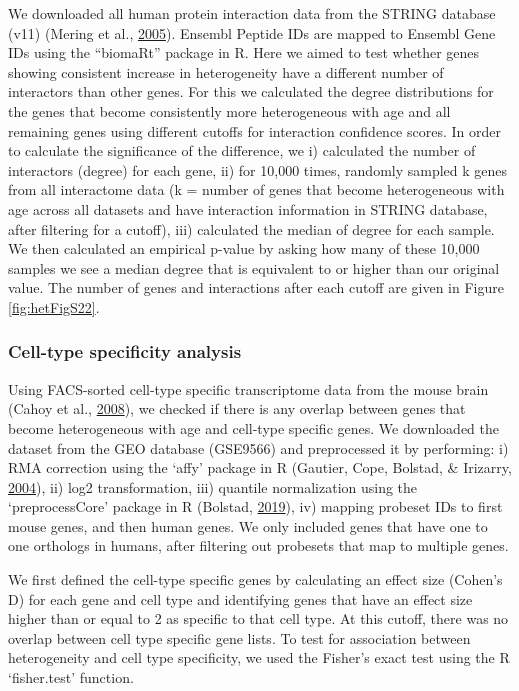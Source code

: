 \documentclass[12pt,twoside]{unicam}
\begin{document}
We downloaded all human protein interaction data from the STRING database (v11) (Mering et al., \protect\hyperlink{ref-VonMering2005}{2005}). Ensembl Peptide IDs are mapped to Ensembl Gene IDs using the ``biomaRt'' package in R. Here we aimed to test whether genes showing consistent increase in heterogeneity have a different number of interactors than other genes. For this we calculated the degree distributions for the genes that become consistently more heterogeneous with age and all remaining genes using different cutoffs for interaction confidence scores. In order to calculate the significance of the difference, we i) calculated the number of interactors (degree) for each gene, ii) for 10,000 times, randomly sampled k genes from all interactome data (k = number of genes that become heterogeneous with age across all datasets and have interaction information in STRING database, after filtering for a cutoff), iii) calculated the median of degree for each sample. We then calculated an empirical p-value by asking how many of these 10,000 samples we see a median degree that is equivalent to or higher than our original value. The number of genes and interactions after each cutoff are given in Figure \ref{fig:hetFigS22}.

\hypertarget{cell-type-specificity-analysis}{%
\subsubsection{Cell-type specificity analysis}\label{cell-type-specificity-analysis}}

Using FACS-sorted cell-type specific transcriptome data from the mouse brain (Cahoy et al., \protect\hyperlink{ref-Cahoy2008}{2008}), we checked if there is any overlap between genes that become heterogeneous with age and cell-type specific genes. We downloaded the dataset from the GEO database (GSE9566) and preprocessed it by performing: i) RMA correction using the `affy' package in R (Gautier, Cope, Bolstad, \& Irizarry, \protect\hyperlink{ref-Gautier2004}{2004}), ii) log2 transformation, iii) quantile normalization using the `preprocessCore' package in R (Bolstad, \protect\hyperlink{ref-Bolstad2019}{2019}), iv) mapping probeset IDs to first mouse genes, and then human genes. We only included genes that have one to one orthologs in humans, after filtering out probesets that map to multiple genes.

We first defined the cell-type specific genes by calculating an effect size (Cohen's D) for each gene and cell type and identifying genes that have an effect size higher than or equal to 2 as specific to that cell type. At this cutoff, there was no overlap between cell type specific gene lists. To test for association between heterogeneity and cell type specificity, we used the Fisher's exact test using the R `fisher.test' function.
\end{document}
